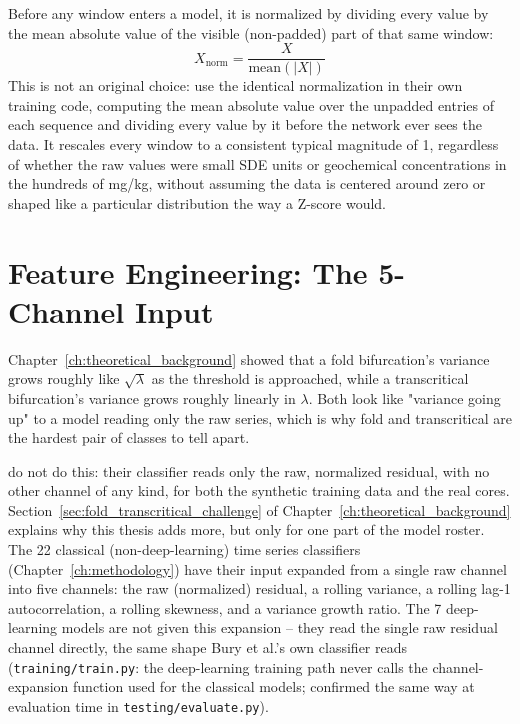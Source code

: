 Before any window enters a model, it is normalized by dividing every value by the mean absolute value of the visible (non-padded) part of that same window:
\begin{equation}
    X_{\text{norm}} = \frac{X}{\text{mean}(|X|)}
\end{equation}
This is not an original choice: \citet{bury2021} use the identical normalization in their own training code, computing the mean absolute value over the unpadded entries of each sequence and dividing every value by it before the network ever sees the data. It rescales every window to a consistent typical magnitude of 1, regardless of whether the raw values were small SDE units or geochemical concentrations in the hundreds of mg/kg, without assuming the data is centered around zero or shaped like a particular distribution the way a Z-score would.

\section{Feature Engineering: The 5-Channel Input}
\label{sec:feature_engineering}

Chapter~\ref{ch:theoretical_background} showed that a fold bifurcation's variance grows roughly like $\sqrt{\lambda}$ as the threshold is approached, while a transcritical bifurcation's variance grows roughly linearly in $\lambda$. Both look like "variance going up" to a model reading only the raw series, which is why fold and transcritical are the hardest pair of classes to tell apart.

\citet{bury2021} do not do this: their classifier reads only the raw, normalized residual, with no other channel of any kind, for both the synthetic training data and the real cores. Section~\ref{sec:fold_transcritical_challenge} of Chapter~\ref{ch:theoretical_background} explains why this thesis adds more, but only for one part of the model roster. The 22 classical (non-deep-learning) time series classifiers (Chapter~\ref{ch:methodology}) have their input expanded from a single raw channel into five channels: the raw (normalized) residual, a rolling variance, a rolling lag-1 autocorrelation, a rolling skewness, and a variance growth ratio. The 7 deep-learning models are not given this expansion -- they read the single raw residual channel directly, the same shape Bury et al.'s own classifier reads (\texttt{training/train.py}: the deep-learning training path never calls the channel-expansion function used for the classical models; confirmed the same way at evaluation time in \texttt{testing/evaluate.py}).

